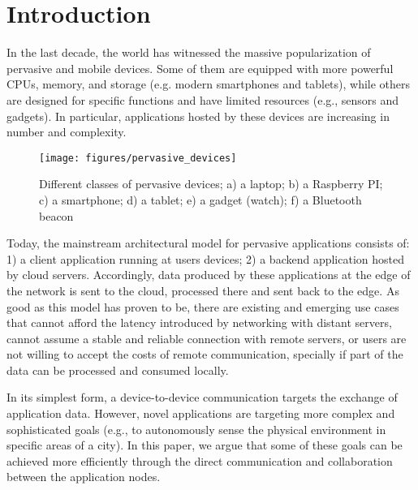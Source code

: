 \section{Introduction}
\label{sec:intro}


In the last decade, the world has witnessed the massive popularization of pervasive and mobile devices. Some of them are equipped with more powerful CPUs, memory, and storage (e.g. modern smartphones and tablets), while others are designed for specific functions and have limited resources (e.g., sensors and gadgets). In particular, applications hosted by these devices are increasing in number and complexity. 

\begin{figure}[t!]
	\centering
	\texttt{[image: figures/pervasive\_devices]}
	\caption{Different classes of pervasive devices; a) a laptop; b) a Raspberry PI; c) a smartphone; d) a tablet; e) a gadget (watch); f) a Bluetooth beacon}
	\label{fig:pervasive_devices}
\end{figure}

Today, the mainstream architectural model for pervasive applications consists of: 1) a client application running at users devices; 2) a backend application hosted by cloud servers. Accordingly, data produced by these applications at the edge of the network is sent to the cloud, processed there and sent back to the edge. As good as this model has proven to be, there are existing and emerging use cases that cannot afford the latency introduced by networking with distant servers, cannot assume a stable and reliable connection with remote servers, or users are not willing to accept the costs of remote communication, specially if part of the data can be processed and consumed locally.

In its simplest form, a device-to-device communication targets the exchange of application data. However, novel applications are targeting more complex and sophisticated goals (e.g., to autonomously sense the physical environment in specific areas of a city). In this paper, we argue that some of these goals can be achieved more efficiently through the direct communication and collaboration between the application nodes. %

